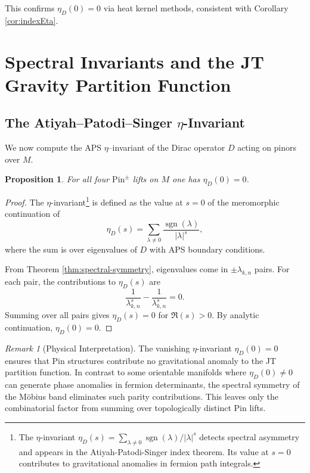 \documentclass[11pt]{amsart}
\newtheorem{proposition}[theorem]{Proposition}
\theoremstyle{definition}
\theoremstyle{remark}
\newtheorem{remark}[theorem]{Remark}
\DeclareMathOperator{\sgn}{sgn}
\begin{document}
This confirms $\eta_D(0) = 0$ via heat kernel methods, consistent with Corollary \ref{cor:indexEta}.

\section{Spectral Invariants and the JT Gravity Partition Function}

\subsection{The Atiyah--Patodi--Singer \texorpdfstring{$\eta$}{eta}-Invariant}\label{sec:APS}


We now compute the APS $\eta$–invariant of the Dirac operator $D$ acting on pinors over $M$.

\begin{proposition}\label{prop:eta}
For all four $\mathrm{Pin}^{\pm}$ lifts on $M$ one has $\eta_D(0)=0$.
\end{proposition}

\begin{proof}
The $\eta$-invariant\footnote{The $\eta$-invariant $\eta_D(s) = \sum_{\lambda \neq 0} \sgn(\lambda)/|\lambda|^s$ detects spectral asymmetry and appears in the Atiyah-Patodi-Singer index theorem. Its value at $s=0$ contributes to gravitational anomalies in fermion path integrals.} is defined as the value at $s=0$ of the meromorphic continuation of
\[
\eta_D(s) = \sum_{\lambda \neq 0} \frac{\sgn(\lambda)}{|\lambda|^s},
\]
where the sum is over eigenvalues of $D$ with APS boundary conditions.

From Theorem \ref{thm:spectral-symmetry}, eigenvalues come in $\pm \lambda_{k,n}$ pairs. For each pair, the contributions to $\eta_D(s)$ are
\[
\frac{1}{\lambda_{k,n}^s} - \frac{1}{\lambda_{k,n}^s} = 0.
\]
Summing over all pairs gives $\eta_D(s) = 0$ for $\Re(s) > 0$.  By analytic continuation, $\eta_D(0) = 0$.
\end{proof}

\begin{remark}[Physical Interpretation]
The vanishing $\eta$-invariant $\eta_D(0) = 0$ ensures that Pin structures contribute no gravitational anomaly to the JT partition function. In contrast to some orientable manifolds where $\eta_D(0) \neq 0$ can generate phase anomalies in fermion determinants, the spectral symmetry of the Möbius band eliminates such parity contributions. This leaves only the combinatorial factor from summing over topologically distinct Pin lifts.
\end{remark}
\end{document}
